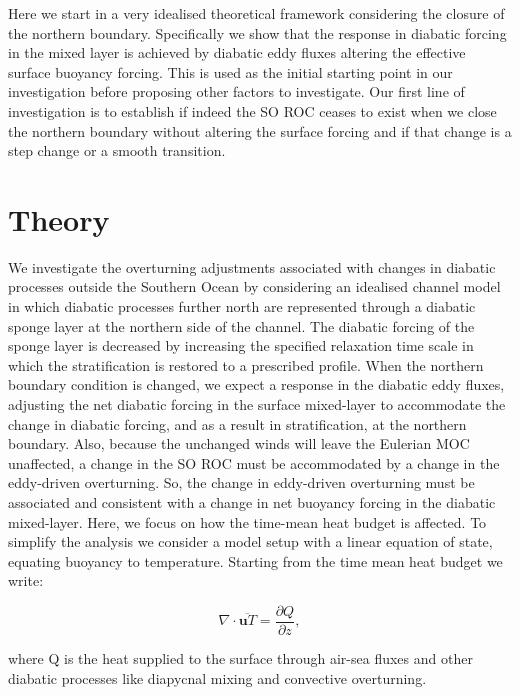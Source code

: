 Here we start in a very idealised theoretical framework considering the closure of the northern boundary. Specifically we show that the response in diabatic forcing in the mixed layer is achieved by diabatic eddy fluxes altering the effective surface buoyancy forcing. This is used as the initial starting point in our investigation before proposing other factors to investigate. Our first line of investigation is to establish if indeed the SO ROC ceases to exist when we close the northern boundary without altering the surface forcing and if that change is a step change or a smooth transition. 
\section{Theory}

We investigate the overturning adjustments associated with changes in diabatic processes outside the Southern Ocean by considering an idealised channel model in which diabatic processes further north are represented through a diabatic sponge layer at the northern side of the channel. The diabatic forcing of the sponge layer is decreased by increasing the specified relaxation time scale in which the stratification is restored to a prescribed profile. When the northern boundary condition is changed, we expect a response in the diabatic eddy fluxes, adjusting the net diabatic forcing in the surface mixed-layer to accommodate the change in diabatic forcing, and as a result in stratification, at the northern boundary. Also, because the unchanged winds will leave the Eulerian MOC unaffected, a change in the SO ROC must be accommodated by a change in the eddy-driven overturning. So, the change in eddy-driven overturning must be associated and consistent with a change in net buoyancy forcing in the diabatic mixed-layer.
Here, we focus on how the time-mean heat budget is affected. To simplify the analysis we consider a model setup with a linear equation of state, equating buoyancy to temperature. Starting from the time mean heat budget we write:

\begin{equation}
\nabla \cdot \overline{\textbf{u}T} = \frac{\partial Q}{\partial z},
\label{eq:B_budget}
\end{equation}

where Q is the heat supplied to the surface through air-sea fluxes and other diabatic processes like diapycnal mixing and convective overturning.

